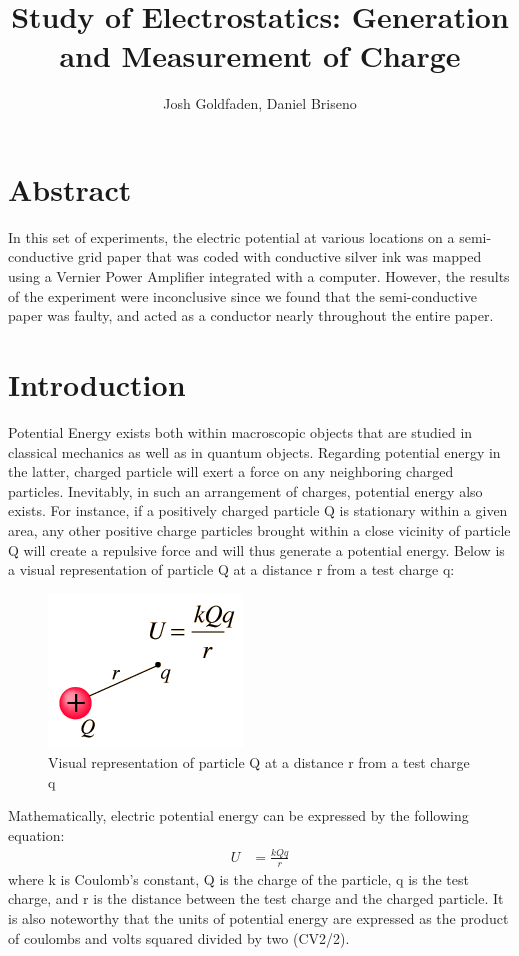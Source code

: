\documentclass[oneside,12pt]{amsart}
\title{Study of Electrostatics: Generation and Measurement of Charge}
\author{Josh Goldfaden, Daniel Briseno}
\date{}
\begin{document}
	\maketitle
	\section{Abstract}
	\indent In this set of experiments, the electric potential at various locations on a semi-conductive grid paper that was coded with conductive silver ink was mapped using a Vernier Power Amplifier integrated with a computer. However, the results of the experiment were inconclusive since we found that the semi-conductive paper was faulty, and acted as a conductor nearly throughout the entire paper.
	\section{Introduction}
	Potential Energy exists both within macroscopic objects that are studied in classical mechanics as well as in quantum objects. Regarding potential energy in the latter, charged particle will exert a force on any neighboring charged particles. Inevitably, in such an arrangement of charges, potential energy also exists. For instance, if a positively charged particle Q is stationary within a given area, any other positive charge particles brought within a close vicinity of particle Q will create a repulsive force and will thus generate a potential energy. Below is a visual representation of particle Q at a distance r from a test charge q\cite{electricpotentialenergy}:
	\begin{figure}[H]
		\includegraphics[width=\smallgraph,scale=0.01]{Pontential.png}
		\caption{ Visual representation of particle Q at a distance r from a test charge q  \cite{electricpotentialenergy}}
		\label{Potential}
	\end{figure}
	
	\indent Mathematically, electric potential energy can be expressed by the following equation:
	\begin{align}
		U &= \frac{kQq}{r}
	\end{align}
	where k is Coulomb’s constant, Q is the charge of the particle, q is the test charge, and r is the distance between the test charge and the charged particle. It is also noteworthy that the units of potential energy are expressed as the product of coulombs and volts squared divided by two (CV2/2). 
	
\end{document}
